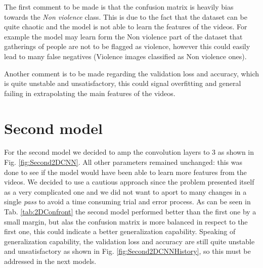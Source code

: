 The first comment to be made is that the confusion matrix is heavily bias towards the \textit{Non violence} class. This is due to the fact that the dataset can be quite chaotic and the model is not able to learn the features of the videos. For example the model may learn form the Non violence part of the dataset that gatherings of people are not to be flagged as violence, however this could easily lead to many false negatives (Violence images classified as Non violence ones).

Another comment is to be made regarding the validation loss and accuracy, which is quite unstable and unsatisfactory, this could signal overfitting and general failing in extrapolating the main features of the videos.
\pagebreak
\section{Second model}
For the second model we decided to amp the convolution layers to 3 as shown in Fig. \ref{fig:Second2DCNN}. All other parameters remained unchanged: this was done to see if the model would have been able to learn more features from the videos. 
We decided to use a cautious approach since the problem presented itself as a very complicated one and we did not want to aport to many changes in a single \textit{pass} to avoid a time consuming trial and error process. As can be seen in Tab. \ref{tab:2DConfront} the second model performed better than the first one by a small margin, but alas the confusion matrix is more balanced in respect to the first one, this could indicate a better generalization capability. Speaking of generalization capability, the validation loss and accuracy are still quite unstable and unsatisfactory as shown in Fig. \ref*{fig:Second2DCNNHistory}, so this must be addressed in the next models.
